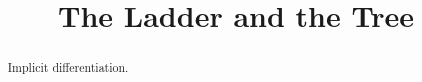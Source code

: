 \documentclass{ximera}
\title{The Ladder and the Tree}
\begin{document}
\begin{abstract}
Implicit differentiation.
\end{abstract}
\maketitle
\end{document}
